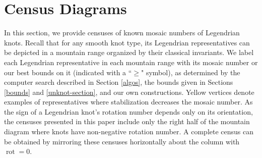 \documentclass{article}
\DeclareMathOperator{\tb}{tb}
\DeclareMathOperator{\rot}{rot}
\newcommand{\Q}{\mathbb{Q}}
\newcommand{\R}{\mathbb{R}}
\newcommand{\C}{\mathbb{C}}
\newcommand{\Z}{\mathbb{Z}}
\newcommand{\N}{\mathbb{N}}
\newcommand{\F}{\mathbb{F}}
\begin{document}
\section{Census Diagrams} \label{census-list}
    In this section, we provide censuses of known mosaic numbers of Legendrian knots.
    Recall that for any smooth knot type, its Legendrian representatives can be depicted in a mountain range organized by their classical invariants.
    We label each Legendrian representative in each mountain range with its mosaic number or our best bounds on it (indicated with a ``$\geq$" symbol), as determined by the computer search described in Section \ref{algos}, the bounds given in Sections \ref{bounds} and \ref{unknot-section}, and our own constructions. Yellow vertices denote examples of representatives where stabilization decreases the mosaic number.
    As the sign of a Legendrian knot's rotation number depends only on its orientation, the censuses presented in this paper include only the right half of the mountain diagram where knots have non-negative rotation number. A complete census can be obtained by mirroring these censuses horizontally about the column with $\rot = 0$. 

    \vspace{-10pt}







\end{document}

